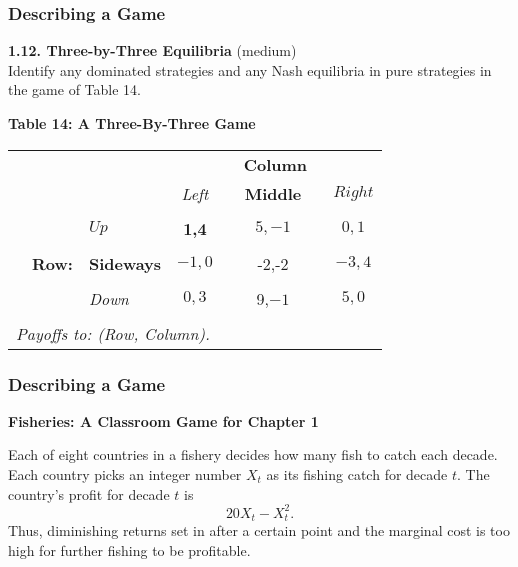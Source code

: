  \begin{frame}[fragile]\frametitle{Describing a Game}

 {\bf 1.12. Three-by-Three Equilibria} (medium)\\
Identify any  dominated strategies and any Nash equilibria in pure strategies in
the   game of Table 14.

  \begin{center} {\bf   Table 14:  A  Three-By-Three Game   }

 \begin{tabular}{lllccccc} &       &             &\multicolumn{5}{c}{\bf Column}
\\ &       &   &  {\it  Left }   &   &  {\bf Middle}   & &$Right$ \\ &   && & &
& \\ &   &  $ Up$       &  {\bf 1,4}&    &  $5,-1 $&  & $0, 1$\\ &  && & &  & \\
& {\bf Row:} &    {\bf Sideways }    &    $ -1,0$  &    & -2,-2 & & $-3,4$ \\ &
&& & &  & \\ &  &    {\it Down }    &      $ 0,3$  &    & 9,$-1$  & & $ 5,0$ \\
&   && & &  & \\ \multicolumn{8}{l}{\it Payoffs to: (Row, Column).}
  \end{tabular} \end{center}

\end{frame}
 \begin{frame}[fragile]\frametitle{Describing a Game}
\begin{center}
{\bf  Fisheries:  A Classroom Game for  Chapter 1}
 \end{center}


   Each of eight countries   in a fishery decides how many fish to catch each
decade. Each country picks  an integer  number $X_t$ as its fishing catch for
decade $t$. The country's profit for    decade  $t$ is
\begin{equation} \label{e100}
20X_t - X_t^2.
 \end{equation}
     Thus,   diminishing returns set in after  a certain point and the marginal
cost is too high for further fishing to be profitable.

\end{frame}
